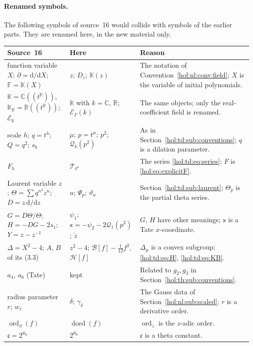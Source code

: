 \documentclass[11pt]{article}
\numberwithin{equation}{section}
\theoremstyle{definition}
\theoremstyle{remark}
\newcommand{\C}{\mathbb C}
\newcommand{\R}{\mathbb R}
\newcommand{\KK}{\mathbb K}
\newcommand{\EK}{\mathcal E_\Gamma(k)}
\begin{document}
\paragraph{Renamed symbols.}
The following symbols of source~16 would collide with symbols of the earlier
parts. They are renamed here, in the new material only.
{\small
\begin{longtable}{@{}>{\raggedright\arraybackslash}p{}
>{\raggedright\arraybackslash}p{}
>{\raggedright\arraybackslash}p{}@{}}
\toprule
Source~16 & Here & Reason\\
\midrule
\endhead
function variable $X$; $\partial=\mathrm d/\mathrm dX$; $\mathbb F=\mathbb K(X)$ & $z$;
$D_z$; $\KK(z)$ & The notation of Convention~\ref{hol:nl:conv:field};
$X$ is the variable of initial polynomials.\\
$\mathbb K=\C((t^\R))$, $\mathbb K_\R=\R((t^\R))$; $\mathcal E_{\mathbb K}$ & $\KK$ with $k=\C$, $\R$;
$\EK$ & The same objects; only the real-coefficient field is renamed.\\
scale $h$; $q=t^h$; $Q=q^2$; $s_k$ & $\mu$; $p=t^\mu$; $p^2$;
$\mathcal Q_k(p^2)$ & As in Section~\ref{hol:td:sub:conventions}; $q$ is a
dilation parameter.\\
$F_h$ & $\mathcal T_{t^\mu}$ & The series \eqref{hol:td:eq:series}; $F$ is
\eqref{hol:eq:explicitF}.\\
Laurent variable $z$; $\Theta=\sum q^{n^2}z^n$; $D=z\,\mathrm d/\mathrm dz$ &
$u$; $\Psi_p$; $\vartheta_u$ & Section~\ref{hol:td:sub:laurent}; $\Theta_p$ is
the partial theta series.\\
$G=D\Theta/\Theta$; $H=-DG-2s_1$; $Y=z-z^{-1}$ & $\psi_1$;
$\mathsf x=-\psi_2-2\mathcal Q_1(p^2)$; $\check z$ & $G$, $H$ have other
meanings; $\mathsf x$ is a Tate $x$-coordinate.\\
$\Delta=X^2-4$; $A$, $B$ of its (3.3) & $z^2-4$; $\mathcal B[f]-\frac1{12}f^2$,
$\mathcal H[f]$ & $\Delta_\mu$ is a convex subgroup; \eqref{hol:td:eq:H},
\eqref{hol:td:eq:KB}.\\
$a_4$, $a_6$ (Tate) & kept & Related to $g_2,g_3$ in
Section~\ref{hol:th:sub:conventions}.\\
radius parameter $r$; $w_r$ & $\delta$; $\gamma_\delta$ & The Gauss data of
Section~\ref{hol:nl:sub:scaled}; $r$ is a derivative order.\\
$\operatorname{ord}_\partial(f)$ & $\operatorname{dord}(f)$ & $\operatorname{ord}_z$ is the
$z$-adic order.\\
$\mathfrak c=2^{\aleph_0}$ & $2^{\aleph_0}$ & $\mathfrak c$ is a theta constant.\\

\end{longtable}}
\end{document}
